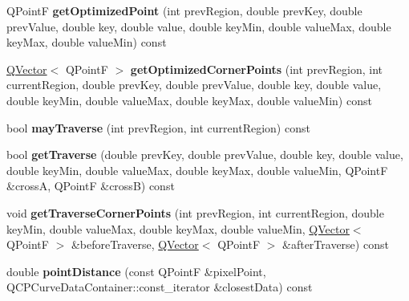 \begin{DoxyCompactItemize}
\item 
Q\+PointF {\bfseries get\+Optimized\+Point} (int prev\+Region, double prev\+Key, double prev\+Value, double key, double value, double key\+Min, double value\+Max, double key\+Max, double value\+Min) const \hypertarget{class_q_c_p_curve_a4ed1566795ea51d519f9f0d17f0f131d}{}\label{class_q_c_p_curve_a4ed1566795ea51d519f9f0d17f0f131d}

\item 
\hyperlink{class_q_vector}{Q\+Vector}$<$ Q\+PointF $>$ {\bfseries get\+Optimized\+Corner\+Points} (int prev\+Region, int current\+Region, double prev\+Key, double prev\+Value, double key, double value, double key\+Min, double value\+Max, double key\+Max, double value\+Min) const \hypertarget{class_q_c_p_curve_aa64007f561dc2e7145f45548d1f6566b}{}\label{class_q_c_p_curve_aa64007f561dc2e7145f45548d1f6566b}

\item 
bool {\bfseries may\+Traverse} (int prev\+Region, int current\+Region) const \hypertarget{class_q_c_p_curve_ae5b232c8201441a940516c745309a685}{}\label{class_q_c_p_curve_ae5b232c8201441a940516c745309a685}

\item 
bool {\bfseries get\+Traverse} (double prev\+Key, double prev\+Value, double key, double value, double key\+Min, double value\+Max, double key\+Max, double value\+Min, Q\+PointF \&crossA, Q\+PointF \&crossB) const \hypertarget{class_q_c_p_curve_aa5ba854363f7343c829e37c7d19830cd}{}\label{class_q_c_p_curve_aa5ba854363f7343c829e37c7d19830cd}

\item 
void {\bfseries get\+Traverse\+Corner\+Points} (int prev\+Region, int current\+Region, double key\+Min, double value\+Max, double key\+Max, double value\+Min, \hyperlink{class_q_vector}{Q\+Vector}$<$ Q\+PointF $>$ \&before\+Traverse, \hyperlink{class_q_vector}{Q\+Vector}$<$ Q\+PointF $>$ \&after\+Traverse) const \hypertarget{class_q_c_p_curve_ab231faca0b8d53c19be37c1baea14dd8}{}\label{class_q_c_p_curve_ab231faca0b8d53c19be37c1baea14dd8}

\item 
double {\bfseries point\+Distance} (const Q\+PointF \&pixel\+Point, Q\+C\+P\+Curve\+Data\+Container\+::const\+\_\+iterator \&closest\+Data) const \hypertarget{class_q_c_p_curve_ad95dda62d82d34271cdd22708a278d97}{}\label{class_q_c_p_curve_ad95dda62d82d34271cdd22708a278d97}

\end{DoxyCompactItemize}
